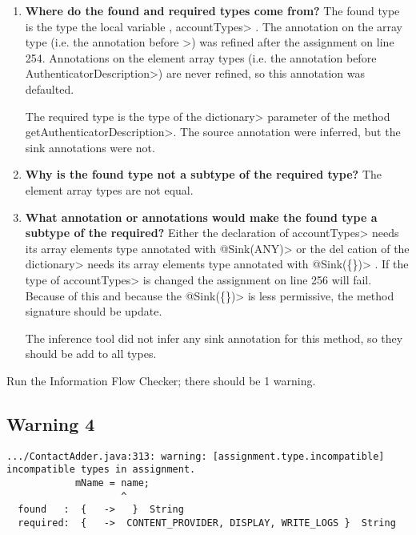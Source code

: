  \begin{enumerate}

\item\textbf{Where do the found and required types come from?}
 The found type is the type the local variable , \<accountTypes> . The annotation on the array type 
 (i.e. the annotation before \<[]>) was refined after the assignment on line 254.  Annotations on the element 
 array types (i.e. the annotation before \<AuthenticatorDescription>)  are never refined, so this annotation was 
 defaulted. 
 
The required type is the type of the \<dictionary> parameter of the method \<getAuthenticatorDescription>.  
The source annotation were inferred, but the sink annotations were not. 

\item \textbf{Why is the found type not a subtype of the required type? }
The element array types are not equal.

\item\textbf{What annotation or annotations would make the found type a subtype of the required?}
Either the declaration of \<accountTypes> needs its array elements type annotated with \<@Sink(ANY)> 
or the del cation of the  \<dictionary> needs its array elements type annotated with \<@Sink(\{\})> .  
If the type of \<accountTypes> is changed the assignment on line 256 will fail.  Because of this and 
because the \<@Sink(\{\})> is less permissive, the method signature should be update.

The inference tool did not infer any sink annotation for this method, so they should be add to all types.

  

 \end{enumerate}

Run the Information Flow Checker; there should be 1 warning.
  
  \subsection{Warning 4 }
   \begin{Verbatim}
.../ContactAdder.java:313: warning: [assignment.type.incompatible] incompatible types in assignment.
            mName = name;
                    ^
  found   :  {   ->   }  String
  required:  {   ->  CONTENT_PROVIDER, DISPLAY, WRITE_LOGS }  String
 \end{Verbatim} 

